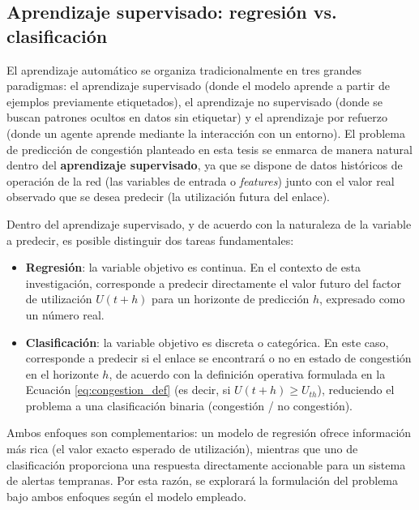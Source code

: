 \documentclass[12pt]{report}
\begin{document}
\subsection{Aprendizaje supervisado: regresión vs. clasificación}
\label{subsec:supervisado}

El aprendizaje automático se organiza tradicionalmente en tres grandes paradigmas: el aprendizaje supervisado (donde el modelo aprende a partir de ejemplos previamente etiquetados), el aprendizaje no supervisado (donde se buscan patrones ocultos en datos sin etiquetar) y el aprendizaje por refuerzo (donde un agente aprende mediante la interacción con un entorno). El problema de predicción de congestión planteado en esta tesis 
se enmarca de manera natural dentro del \textbf{aprendizaje supervisado}, ya que se dispone de datos históricos de operación de la red (las variables de entrada o \textit{features}) junto con el valor real observado que se desea predecir (la utilización futura del enlace).

Dentro del aprendizaje supervisado, y de acuerdo con la naturaleza de la variable a predecir, es posible distinguir dos tareas fundamentales:

\begin{itemize}
    \item \textbf{Regresión}: la variable objetivo es continua. En el contexto de esta investigación, corresponde a predecir directamente el valor futuro del factor de utilización $U(t + h)$ para un horizonte de predicción $h$, expresado como un número real.
    \item \textbf{Clasificación}: la variable objetivo es discreta o categórica. En este caso, corresponde a predecir si el enlace se encontrará o no en estado de congestión en el horizonte $h$, de acuerdo con la definición operativa formulada en la Ecuación \ref{eq:congestion_def} (es decir, si $U(t+h) \geq U_{th}$), reduciendo el problema a una clasificación binaria (congestión / no congestión).
\end{itemize}

Ambos enfoques son complementarios: un modelo de regresión ofrece información más rica (el valor exacto esperado de utilización), mientras que uno de clasificación proporciona una respuesta directamente accionable para un sistema de alertas tempranas. Por esta razón, se explorará la formulación del problema bajo ambos enfoques según el modelo empleado.
\end{document}
